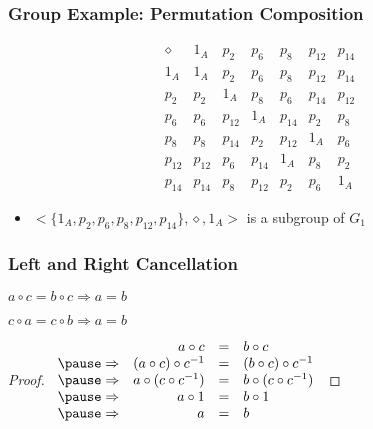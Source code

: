 \documentclass[dvipsnames]{beamer}
\begin{document}
\begin{frame}
  \frametitle{Group Example: Permutation Composition}

  \begin{example}
    \[
      \begin{array}{c||c|c|c|c|c|c}
        \diamond & 1_{A}  & p_{2}  & p_{6}  & p_{8}  & p_{12} & p_{14}\\\hline\hline
        1_{A}    & 1_{A}  & p_{2}  & p_{6}  & p_{8}  & p_{12} & p_{14}\\\hline
        p_{2}    & p_{2}  & 1_{A}  & p_{8}  & p_{6}  & p_{14} & p_{12}\\\hline
        p_{6}    & p_{6}  & p_{12} & 1_{A}  & p_{14} & p_{2}  & p_{8}\\\hline
        p_{8}    & p_{8}  & p_{14} & p_{2}  & p_{12} & 1_{A}  & p_{6}\\\hline
        p_{12}   & p_{12} & p_{6}  & p_{14} & 1_{A}  & p_{8}  & p_{2}\\\hline
        p_{14}   & p_{14} & p_{8}  & p_{12} & p_{2}  & p_{6}  & 1_{A}
      \end{array}
    \]

    \bigskip
    \begin{itemize}
      \item $<\{1_A,p_2,p_6,p_8,p_{12},p_{14}\},\diamond,1_A>$
        is a subgroup of $G_1$
    \end{itemize}
  \end{example}
\end{frame}

\begin{frame}
  \frametitle{Left and Right Cancellation}

  \begin{theorem}
    $a \circ c = b \circ c \Rightarrow a = b$

    $c \circ a = c \circ b \Rightarrow a = b$
  \end{theorem}

  \pause
  \begin{proof}
    $\begin{array}{crcl}
                  & a \circ c                & = & b \circ c\\ \pause
      \Rightarrow & (a \circ c) \circ c^{-1} & = & (b \circ c) \circ c^{-1}\\ \pause
      \Rightarrow & a \circ (c \circ c^{-1}) & = & b \circ (c \circ c^{-1})\\ \pause
      \Rightarrow & a \circ 1                & = & b \circ 1\\ \pause
      \Rightarrow & a                        & = & b
    \end{array}$

  \end{proof}
\end{frame}
\end{document}
